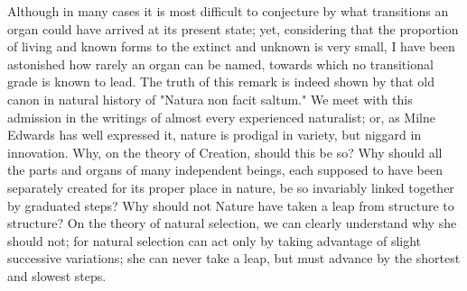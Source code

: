 Although in many cases it is most difficult to conjecture by what transitions an organ could have arrived at its present state; yet, considering that the proportion of living and known forms to the extinct and unknown is very small, I have been astonished how rarely an organ can be named, towards which no transitional grade is known to lead. The truth of this remark is indeed shown by that old canon in natural history of "Natura non facit saltum." We meet with this admission in the writings of almost every experienced naturalist; or, as Milne Edwards has well expressed it, nature is prodigal in variety, but niggard in innovation. Why, on the theory of Creation, should this be so? Why should all the parts and organs of many independent beings, each supposed to have been separately created for its proper place in nature, be so invariably linked together by graduated steps? Why should not Nature have taken a leap from structure to structure? On the theory of natural selection, we can clearly understand why she should not; for natural selection can act only by taking advantage of slight successive variations; she can never take a leap, but must advance by the shortest and slowest steps.

